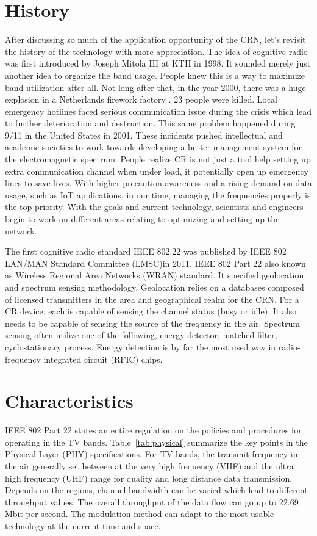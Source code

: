 \section{History}
After discussing so much of the application opportunity of the CRN, let's revisit the history of the technology with 
more appreciation. The idea of cognitive radio was first introduced by Joseph Mitola III at KTH in 1998. It sounded 
merely just another idea to organize the band usage. People knew this is a way to maximize band utilization after all.
Not long after that, in the year 2000, there was a huge explosion in a Netherlands firework factory \cite{cr_history}. 
23 people were killed. Local emergency hotlines faced serious communication issue during the crisis which lead to further
deterioration and destruction. This same problem happened during 9/11 in the United States in 2001. These incidents
pushed intellectual and academic societies to work towards developing a better management system for the electromagnetic
spectrum. People realize CR is not just a tool help setting up extra communication channel when under load, it
potentially open up emergency lines to save lives. With higher precaution awareness and a rising demand on data usage, such as IoT applications, in our time, managing the frequencies properly is the top priority. With the goals and current technology, scientists and engineers
begin to work on different areas relating to optimizing and setting up the network.

The first cognitive radio standard IEEE 802.22 was published by IEEE 802 LAN/MAN Standard Committee (LMSC)in 2011. 
IEEE 802 Part 22 also known as Wireless Regional Area Networks (WRAN) standard. It specified geolocation and spectrum
sensing methodology. Geolocation relies on a databases composed of licensed transmitters in the area and geographical 
realm for the CRN. For a CR device, each is capable of sensing the channel status (busy or idle). It also needs to be 
capable of sensing the source of the frequency in the air. Spectrum sensing often utilize one of the following, energy 
detector, matched filter, cyclostationary process. Energy detection is by far the most used way in radio-frequency 
integrated circuit (RFIC) chips. 


\section{Characteristics}
IEEE 802 Part 22 states an entire regulation on the policies and procedures for operating in the TV bands. 
Table~\ref{tab:physical} summarize the key points in the Physical Layer (PHY) specifications. For TV bands, 
the transmit frequency in the air generally set between at the very high frequency (VHF) and the ultra high frequency (UHF) range
for quality and long distance data transmission. Depends on the regions, channel bandwidth can be varied which lead to
different throughput values. The overall throughput of the data flow can go up to 22.69 Mbit per second.
The modulation method can adapt to the most usable technology at the current time and space. 



